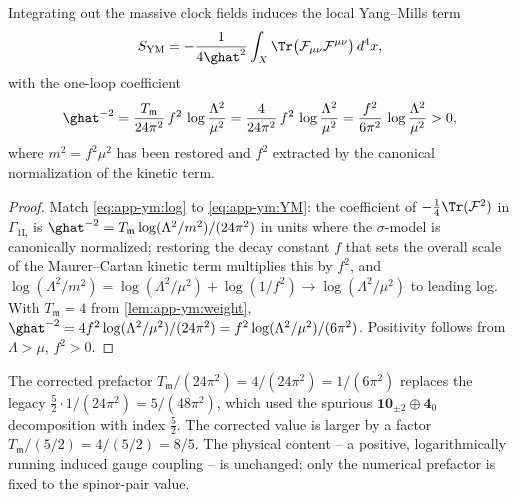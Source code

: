 \begin{theorem}
\label{thm:app-ym:coupling}
Integrating out the massive clock fields induces the local Yang--Mills
term
\begin{equation}\label{eq:app-ym:YM}
  S_{\mathrm{YM}}
  =-\frac{1}{4\ghat^{2}}\int_{X}
    \Tr\bigl(\mathcal F_{\mu\nu}\mathcal F^{\mu\nu}\bigr)\,d^{4}x ,
\end{equation}
with the one-loop coefficient
\begin{equation}\label{eq:app-ym:ghat}
  \ghat^{-2}
  =\frac{T_{\mathfrak m}}{24\pi^{2}}\,f^{2}\,
   \log\frac{\Lambda^{2}}{\mu^{2}}
  =\frac{4}{24\pi^{2}}\,f^{2}\,\log\frac{\Lambda^{2}}{\mu^{2}}
  =\frac{f^{2}}{6\pi^{2}}\,\log\frac{\Lambda^{2}}{\mu^{2}}
  >0 ,
\end{equation}
where $m^{2}=f^{2}\mu^{2}$ has been restored and $f^{2}$ extracted by
the canonical normalization of the kinetic term.
\end{theorem}

\begin{proof}
Match \eqref{eq:app-ym:log} to \eqref{eq:app-ym:YM}: the coefficient of
$-\tfrac14\Tr(\mathcal F^{2})$ in $\Gamma_{\mathrm{1L}}$ is
$\ghat^{-2}=T_{\mathfrak m}\log(\Lambda^{2}/m^{2})/(24\pi^{2})$ in units
where the $\sigma$-model is canonically normalized; restoring the decay
constant $f$ that sets the overall scale of the Maurer--Cartan kinetic
term multiplies this by $f^{2}$, and $\log(\Lambda^{2}/m^{2})
=\log(\Lambda^{2}/\mu^{2})+\log(1/f^{2})\to\log(\Lambda^{2}/\mu^{2})$ to
leading log. With $T_{\mathfrak m}=4$ from \autoref{lem:app-ym:weight},
$\ghat^{-2}=4f^{2}\log(\Lambda^{2}/\mu^{2})/(24\pi^{2})
=f^{2}\log(\Lambda^{2}/\mu^{2})/(6\pi^{2})$. Positivity follows from
$\Lambda>\mu$, $f^{2}>0$.
\end{proof}

\begin{remark}
\label{rem:app-ym:legacy}
The corrected prefactor $T_{\mathfrak m}/(24\pi^{2})=4/(24\pi^{2})
=1/(6\pi^{2})$ replaces the legacy
$\tfrac52\cdot 1/(24\pi^{2})=5/(48\pi^{2})$, which used the spurious
$\mathbf{10}_{\pm2}\oplus\mathbf 4_{0}$ decomposition with index
$\tfrac52$. The corrected value is larger by a factor
$T_{\mathfrak m}/(5/2)=4/(5/2)=8/5$. The physical content -- a
positive, logarithmically running induced gauge coupling -- is unchanged;
only the numerical prefactor is fixed to the spinor-pair value.
\end{remark}

